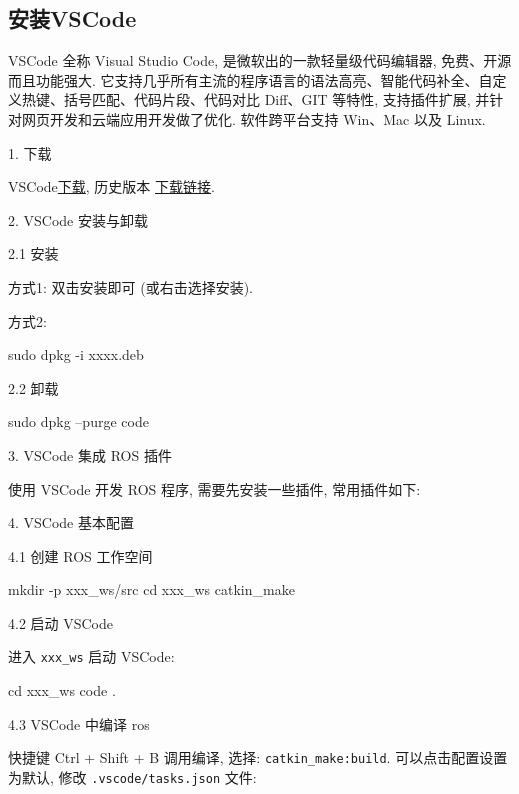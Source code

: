 \documentclass[openany, fontset=windowsold]{ctexbook}
\theoremstyle{kaiti}
\theoremstyle{normal}
\begin{document}
\subsection{安装VSCode}

VSCode 全称 Visual Studio Code, 是微软出的一款轻量级代码编辑器, 免费、开源而且功能强大. 它支持几乎所有主流的程序语言的语法高亮、智能代码补全、自定义热键、括号匹配、代码片段、代码对比 Diff、GIT 等特性, 支持插件扩展, 并针对网页开发和云端应用开发做了优化. 软件跨平台支持 Win、Mac 以及 Linux.

1. 下载

VSCode\href{https://code.visualstudio.com/docs?start=true}{下载}, 历史版本 \href{https://code.visualstudio.com/updates}{下载链接}.

2. VSCode 安装与卸载

2.1 安装

方式1: 双击安装即可 (或右击选择安装).

方式2:

\begin{bash}
  sudo dpkg -i xxxx.deb
\end{bash}

2.2 卸载

\begin{bash}
  sudo dpkg --purge  code
\end{bash}

3. VSCode 集成 ROS 插件

使用 VSCode 开发 ROS 程序, 需要先安装一些插件, 常用插件如下:

4. VSCode 基本配置

4.1 创建 ROS 工作空间

\begin{bash}
  mkdir -p xxx_ws/src
  cd xxx_ws
  catkin_make
\end{bash}

4.2 启动 VSCode

进入 \verb|xxx_ws| 启动 VSCode:

\begin{bash}
  cd xxx_ws
  code .
\end{bash}

4.3 VSCode 中编译 ros

快捷键 Ctrl + Shift + B 调用编译, 选择: \verb|catkin_make:build|. 可以点击配置设置为默认, 修改 \verb|.vscode/tasks.json| 文件:

\end{document}
